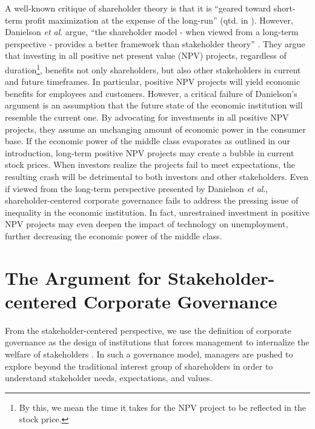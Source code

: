 \documentclass[12pt]{article}
\begin{document}
A well-known critique of shareholder theory is that it is ``geared toward short-term profit maximization at the expense of the long-run'' (qtd. in \cite[Danielson \textit{et al}. 2]{Danielson}). However, Danielson \textit{et al}. argue, ``the shareholder model - when viewed from a long-term perspective - provides a better framework than stakeholder theory'' \cite[Danielson \textit{et al}. 2]{Danielson}. They argue that investing in all positive net present value (NPV) projects, regardless of duration\footnote{By this, we mean the time it takes for the NPV project to be reflected in the stock price.}, benefits not only shareholders, but also other stakeholders in current and future timeframes. In particular, positive NPV projects will yield economic benefits for employees and customers. However, a critical failure of Danielson's argument is an assumption that the future state of the economic institution will resemble the current one. By advocating for investments in all positive NPV projects, they assume an unchanging amount of economic power in the consumer base. If the economic power of the middle class evaporates as outlined in our introduction, long-term positive NPV projects may create a bubble in current stock prices. When investors realize the projects fail to meet expectations, the resulting crash will be detrimental to both investors and other stakeholders. Even if viewed from the long-term perspective presented by Danielson \textit{et al}., shareholder-centered corporate governance fails to address the pressing issue of inequality in the economic institution. In fact, unrestrained investment in positive NPV projects may even deepen the impact of technology on unemployment, further decreasing the economic power of the middle class. 
\section{\large The Argument for Stakeholder-centered Corporate Governance}
From the stakeholder-centered perspective, we use the definition of corporate governance as the design of institutions that forces management to internalize the welfare of stakeholders \cite[Garcia-Castro \textit{et al}. 259]{GarciaCastro}.  In such a governance model, managers are pushed to explore beyond the traditional interest group of shareholders in order to understand stakeholder needs, expectations, and values. 
\end{document}
